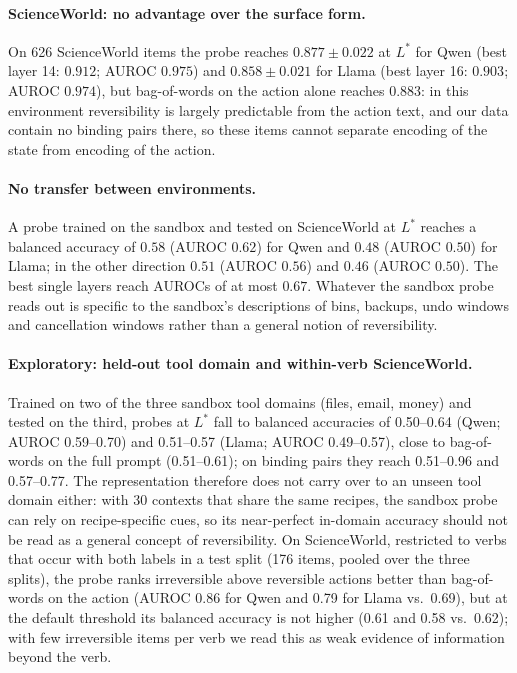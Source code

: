 \documentclass[11pt]{article}
\begin{document}
\paragraph{ScienceWorld: no advantage over the surface form.} On 626 ScienceWorld items the probe reaches $0.877\pm0.022$ at $L^\ast$ for Qwen (best layer 14: $0.912$; AUROC $0.975$) and $0.858\pm0.021$ for Llama (best layer 16: $0.903$; AUROC $0.974$), but bag-of-words on the action alone reaches $0.883$: in this environment reversibility is largely predictable from the action text, and our data contain no binding pairs there, so these items cannot separate encoding of the state from encoding of the action.

\paragraph{No transfer between environments.} A probe trained on the sandbox and tested on ScienceWorld at $L^\ast$ reaches a balanced accuracy of $0.58$ (AUROC $0.62$) for Qwen and $0.48$ (AUROC $0.50$) for Llama; in the other direction $0.51$ (AUROC $0.56$) and $0.46$ (AUROC $0.50$). The best single layers reach AUROCs of at most $0.67$. Whatever the sandbox probe reads out is specific to the sandbox's descriptions of bins, backups, undo windows and cancellation windows rather than a general notion of reversibility.

\paragraph{Exploratory: held-out tool domain and within-verb ScienceWorld.} Trained on two of the three sandbox tool domains (files, email, money) and tested on the third, probes at $L^\ast$ fall to balanced accuracies of 0.50--0.64 (Qwen; AUROC 0.59--0.70) and 0.51--0.57 (Llama; AUROC 0.49--0.57), close to bag-of-words on the full prompt (0.51--0.61); on binding pairs they reach 0.51--0.96 and 0.57--0.77. The representation therefore does not carry over to an unseen tool domain either: with 30 contexts that share the same recipes, the sandbox probe can rely on recipe-specific cues, so its near-perfect in-domain accuracy should not be read as a general concept of reversibility. On ScienceWorld, restricted to verbs that occur with both labels in a test split (176 items, pooled over the three splits), the probe ranks irreversible above reversible actions better than bag-of-words on the action (AUROC 0.86 for Qwen and 0.79 for Llama vs.\ 0.69), but at the default threshold its balanced accuracy is not higher (0.61 and 0.58 vs.\ 0.62); with few irreversible items per verb we read this as weak evidence of information beyond the verb.
\end{document}
